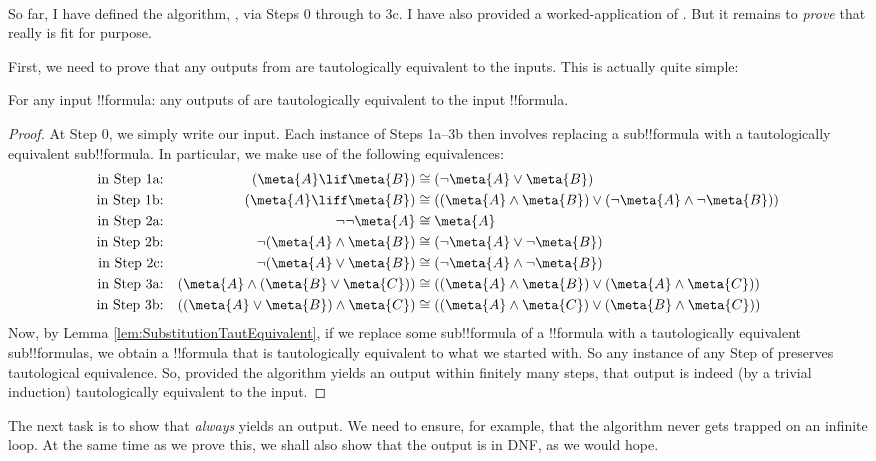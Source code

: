 \documentclass[../../../include/open-logic-section]{subfiles}
\begin{document}
\
\\So far, I have defined the algorithm, \intoDNF, via Steps 0 through to 3c. I have also provided a worked-application of \intoDNF. But it remains to \emph{prove} that \intoDNF{} really is fit for purpose. 

First, we need to prove that any outputs from \intoDNF{} are tautologically equivalent to the inputs. This is actually quite simple:
\begin{lem}\label{lem:IntoDNFEquivalent}
	For any input !!{formula}: any outputs of \intoDNF{} are tautologically equivalent to the input !!{formula}.
	\begin{proof}
		At Step 0, we simply write our input. Each instance of Steps 1a--3b then involves replacing a sub!!{formula} with a tautologically equivalent sub!!{formula}. In particular, we make use of the following equivalences:
	\begin{align*}
		\text{in Step 1a:} & & (\meta{A} \lif \meta{B}) &\cong (\lnot \meta{A} \lor \meta{B})\\
		\text{in Step 1b:} & & (\meta{A} \liff \meta{B}) &\cong ((\meta{A} \land \meta{B}) \lor (\lnot \meta{A} \land \lnot\meta{B}))\\
		\text{in Step 2a:} & & \lnot \lnot \meta{A} &\cong \meta{A}\\
		\text{in Step 2b:} & & \lnot (\meta{A} \land \meta{B})&\cong(\lnot \meta{A} \lor \lnot \meta{B})\\
		\text{in Step 2c:} & & \lnot (\meta{A} \lor \meta{B}) &\cong (\lnot \meta{A} \land \lnot \meta{B})\\
		\text{in Step 3a:} & & 		(\meta{A} \land (\meta{B} \lor \meta{C})) &\cong ((\meta{A} \land \meta{B}) \lor (\meta{A} \land \meta{C}))\\
		\text{in Step 3b:} & & ((\meta{A} \lor \meta{B}) \land \meta{C}) &\cong ((\meta{A} \land \meta{C}) \lor (\meta{B} \land \meta{C}))
		\end{align*}
	Now, by Lemma \ref{lem:SubstitutionTautEquivalent}, if we replace some sub!!{formula} of a !!{formula} with a tautologically equivalent sub!!{formula}s, we obtain a !!{formula} that is tautologically equivalent to what we started with. So any instance of any Step of \intoDNF{} preserves tautological equivalence. So, provided the algorithm yields an output within finitely many steps, that output is indeed (by a trivial induction) tautologically equivalent to the input.
	\end{proof}
\end{lem}\noindent
The next task is to show that \intoDNF{} \emph{always} yields an output. We need to ensure, for example, that the algorithm never gets trapped on an infinite loop. At the same time as we prove this, we shall also show that the output is in DNF, as we would hope. 
\end{document}
